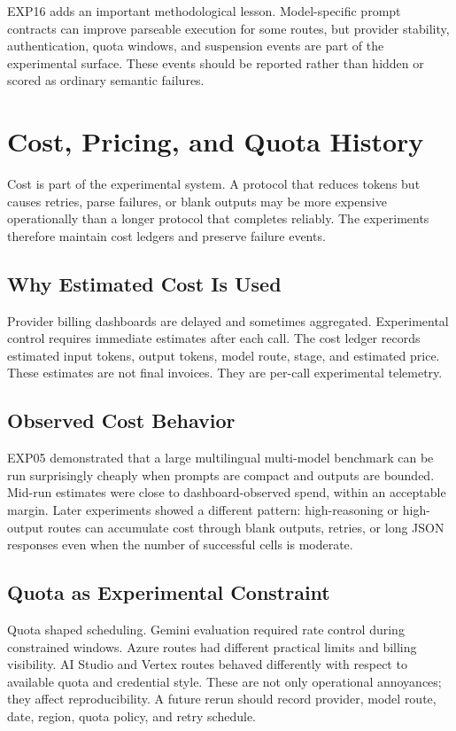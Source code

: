 \documentclass[11pt]{article}
\begin{document}
EXP16 adds an important methodological lesson. Model-specific prompt contracts can improve parseable execution for some routes, but provider stability, authentication, quota windows, and suspension events are part of the experimental surface. These events should be reported rather than hidden or scored as ordinary semantic failures.


\section{Cost, Pricing, and Quota History}
\label{sec:cost_history}
Cost is part of the experimental system. A protocol that reduces tokens but causes retries, parse failures, or blank outputs may be more expensive operationally than a longer protocol that completes reliably. The experiments therefore maintain cost ledgers and preserve failure events.

\subsection{Why Estimated Cost Is Used}
Provider billing dashboards are delayed and sometimes aggregated. Experimental control requires immediate estimates after each call. The cost ledger records estimated input tokens, output tokens, model route, stage, and estimated price. These estimates are not final invoices. They are per-call experimental telemetry.

\subsection{Observed Cost Behavior}
EXP05 demonstrated that a large multilingual multi-model benchmark can be run surprisingly cheaply when prompts are compact and outputs are bounded. Mid-run estimates were close to dashboard-observed spend, within an acceptable margin. Later experiments showed a different pattern: high-reasoning or high-output routes can accumulate cost through blank outputs, retries, or long JSON responses even when the number of successful cells is moderate.

\subsection{Quota as Experimental Constraint}
Quota shaped scheduling. Gemini evaluation required rate control during constrained windows. Azure routes had different practical limits and billing visibility. AI Studio and Vertex routes behaved differently with respect to available quota and credential style. These are not only operational annoyances; they affect reproducibility. A future rerun should record provider, model route, date, region, quota policy, and retry schedule.
\end{document}
